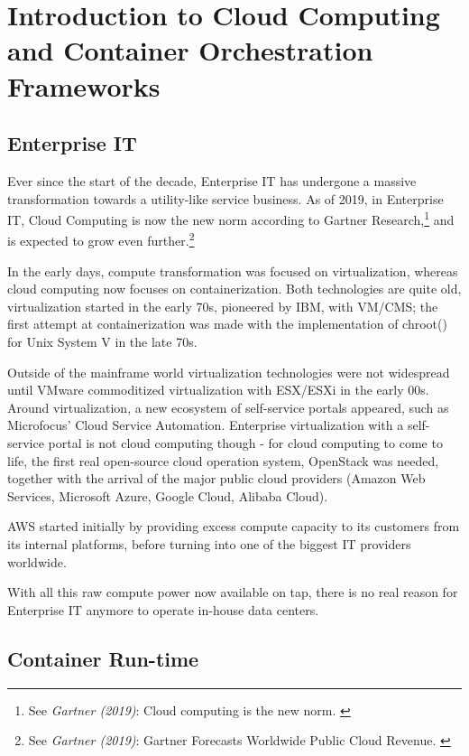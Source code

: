 %
%

\pagebreak
\section{Introduction to Cloud Computing and Container Orchestration Frameworks}

\onehalfspacing

\subsection{Enterprise IT}

Ever since the start of the decade, Enterprise IT has undergone a massive transformation towards a utility-like service business. As of 2019, in Enterprise IT, Cloud Computing is now the new norm according to Gartner Research,\footnote{See \textit{Gartner (2019)}: Cloud computing is the new norm. \cite{gartnerCloudStatement}} and is expected to grow even further.\footnote{See \textit{Gartner (2019)}: Gartner Forecasts Worldwide Public Cloud Revenue. \cite{gartnerForecast}}

In the early days, compute transformation was focused on virtualization, whereas cloud computing now focuses on containerization. Both technologies are quite old, virtualization started in the early 70s, pioneered by IBM, with VM/CMS; the first attempt at containerization was made with the implementation of chroot() for Unix System V in the late 70s.

Outside of the mainframe world virtualization technologies were not widespread until VMware commoditized virtualization with ESX/ESXi in the early 00s. Around virtualization, a new ecosystem of self-service portals appeared, such as Microfocus' Cloud Service Automation. Enterprise virtualization with a self-service portal is not cloud computing though - for cloud computing to come to life, the first real open-source cloud operation system, OpenStack was needed, together with the arrival of the major public cloud providers (Amazon Web Services, Microsoft Azure, Google Cloud, Alibaba Cloud).

AWS started initially by providing excess compute capacity to its customers from its internal platforms, before turning into one of the biggest IT providers worldwide.

With all this raw compute power now available on tap, there is no real reason for Enterprise IT anymore to operate in-house data centers.

\subsection{Container Run-time}

